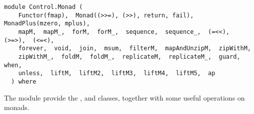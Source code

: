 \label{module:Control.Monad}
\haddockbeginheader
{\haddockverb\begin{verbatim}
module Control.Monad (
    Functor(fmap),  Monad((>>=), (>>), return, fail),  MonadPlus(mzero, mplus), 
    mapM,  mapM_,  forM,  forM_,  sequence,  sequence_,  (=<<),  (>=>),  (<=<), 
    forever,  void,  join,  msum,  filterM,  mapAndUnzipM,  zipWithM, 
    zipWithM_,  foldM,  foldM_,  replicateM,  replicateM_,  guard,  when, 
    unless,  liftM,  liftM2,  liftM3,  liftM4,  liftM5,  ap
  ) where\end{verbatim}}
\haddockendheader

The  module provide the ,  and
  classes, together with some useful operations on monads.
\par

